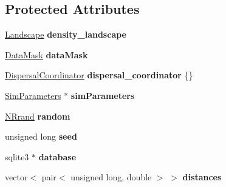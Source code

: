 \subsection*{Protected Attributes}
\begin{DoxyCompactItemize}
\item 
\hyperlink{class_landscape}{Landscape} {\bfseries density\+\_\+landscape}\hypertarget{class_simulate_dispersal_a3538ef66eedcee56817aabb26a1d9d27}{}\label{class_simulate_dispersal_a3538ef66eedcee56817aabb26a1d9d27}

\item 
\hyperlink{class_data_mask}{Data\+Mask} {\bfseries data\+Mask}\hypertarget{class_simulate_dispersal_a06456ecb5cde83be793855a735c196f0}{}\label{class_simulate_dispersal_a06456ecb5cde83be793855a735c196f0}

\item 
\hyperlink{class_dispersal_coordinator}{Dispersal\+Coordinator} {\bfseries dispersal\+\_\+coordinator} \{\}\hypertarget{class_simulate_dispersal_a55da369d57d854168ff6e851b0d7892a}{}\label{class_simulate_dispersal_a55da369d57d854168ff6e851b0d7892a}

\item 
\hyperlink{struct_sim_parameters}{Sim\+Parameters} $\ast$ {\bfseries sim\+Parameters}\hypertarget{class_simulate_dispersal_a6d11b4ed3e3942d2bb42e66116fffd2d}{}\label{class_simulate_dispersal_a6d11b4ed3e3942d2bb42e66116fffd2d}

\item 
\hyperlink{class_n_rrand}{N\+Rrand} {\bfseries random}\hypertarget{class_simulate_dispersal_a5f6389fc4116b52622a900c55532f86b}{}\label{class_simulate_dispersal_a5f6389fc4116b52622a900c55532f86b}

\item 
unsigned long {\bfseries seed}\hypertarget{class_simulate_dispersal_af9ab2fa8b2c3e1bb1ba49b31679ae0d7}{}\label{class_simulate_dispersal_af9ab2fa8b2c3e1bb1ba49b31679ae0d7}

\item 
sqlite3 $\ast$ {\bfseries database}\hypertarget{class_simulate_dispersal_afd3f96f169715aacbcc2939614a6a910}{}\label{class_simulate_dispersal_afd3f96f169715aacbcc2939614a6a910}

\item 
vector$<$ pair$<$ unsigned long, double $>$ $>$ {\bfseries distances}\hypertarget{class_simulate_dispersal_a87359ce728efca1ece43f52c7aa4ce9c}{}\label{class_simulate_dispersal_a87359ce728efca1ece43f52c7aa4ce9c}


\end{DoxyCompactItemize}
